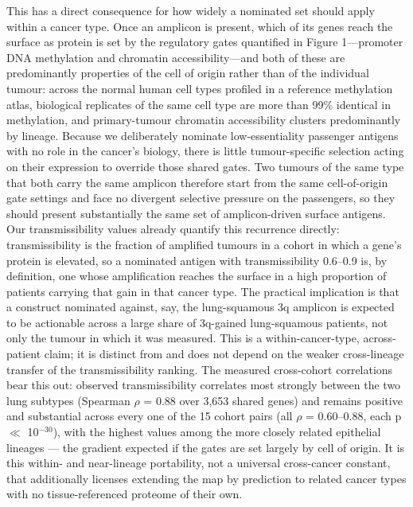 \documentclass[times, twoside]{zHenriquesLab-StyleBioRxiv}
\begin{document}
This has a direct consequence for how widely a nominated set should apply within a cancer type. Once an amplicon is present, which of its genes reach the surface as protein is set by the regulatory gates quantified in Figure 1---promoter DNA methylation and chromatin accessibility---and both of these are predominantly properties of the cell of origin rather than of the individual tumour: across the normal human cell types profiled in a reference methylation atlas, biological replicates of the same cell type are more than 99\% identical in methylation\cite{ref24}, and primary-tumour chromatin accessibility clusters predominantly by lineage\cite{ref25}. Because we deliberately nominate low-essentiality passenger antigens with no role in the cancer's biology, there is little tumour-specific selection acting on their expression to override those shared gates. Two tumours of the same type that both carry the same amplicon therefore start from the same cell-of-origin gate settings and face no divergent selective pressure on the passengers, so they should present substantially the same set of amplicon-driven surface antigens. Our transmissibility values already quantify this recurrence directly: transmissibility is the fraction of amplified tumours in a cohort in which a gene's protein is elevated, so a nominated antigen with transmissibility 0.6--0.9 is, by definition, one whose amplification reaches the surface in a high proportion of patients carrying that gain in that cancer type. The practical implication is that a construct nominated against, say, the lung-squamous 3q amplicon is expected to be actionable across a large share of 3q-gained lung-squamous patients, not only the tumour in which it was measured. This is a within-cancer-type, across-patient claim; it is distinct from and does not depend on the weaker cross-lineage transfer of the transmissibility ranking. The measured cross-cohort correlations bear this out: observed transmissibility correlates most strongly between the two lung subtypes (Spearman $\rho$ = 0.88 over 3,653 shared genes) and remains positive and substantial across every one of the 15 cohort pairs (all $\rho$ = 0.60--0.88, each p $\ll$ 10$^{-30}$), with the highest values among the more closely related epithelial lineages --- the gradient expected if the gates are set largely by cell of origin. It is this within- and near-lineage portability, not a universal cross-cancer constant, that additionally licenses extending the map by prediction to related cancer types with no tissue-referenced proteome of their own.
\end{document}
